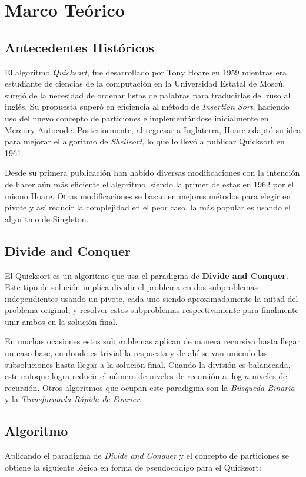 \documentclass[conference]{IEEEtran}
\begin{document}
\section{Marco Teórico}
\subsection{Antecedentes Históricos}
El algoritmo \textit{Quicksort}, fue desarrollado por Tony Hoare en 1959 mientras era estudiante de ciencias de la computación en la Universidad Estatal de Moscú, 
surgió de la necesidad de ordenar listas de palabras para traducirlas del ruso al inglés. 
Su propuesta superó en eficiencia al método de \textit{Insertion Sort}, haciendo uso del nuevo concepto de particiones e implementándose inicialmente en Mercury Autocode. 
Posteriormente, al regresar a Inglaterra, Hoare adaptó su idea para mejorar el algoritmo de \textit{Shellsort}, lo que lo llevó a publicar Quicksort en 1961.\cite{original_paper}
\par
Desde su primera publicación han habido diversas modificaciones con la intención de hacer aún más eficiente el algoritmo, siendo la primer de estas en 1962 por el mismo Hoare.
Otras modificaciones se basan en mejores métodos para elegir en pivote y así reducir la complejidad en el peor caso, la más popular es usando el algoritmo de Singleton.\cite{history} 

\subsection{Divide and Conquer}
El Quicksort es un algoritmo que usa el paradigma de \textbf{Divide and Conquer}. 
Este tipo de solución implica dividir el problema en dos subproblemas independientes usando un pivote, 
cada uno siendo aproximadamente la mitad del problema original, y resolver estos subproblemas respectivamente para finalmente unir ambos en la solución final.\par
En muchas ocasiones estos subproblemas aplican de manera recursiva hasta llegar un caso base, en donde es trivial la respuesta y de ahí se van uniendo las subsoluciones hasta llegar a la solución final.
Cuando la división es balanceada, este enfoque logra reducir el número de niveles de recursión a $\log{n}$ niveles de recursión.
Otros algoritmos que ocupan este paradigma son la \textit{Búsqueda Binaria} y la \textit{Transformada Rápida de Fourier}.\cite{divide_and_conquer}


\subsection{Algoritmo}
Aplicando el paradigma de \textit{Divide and Conquer} y el concepto de particiones se obtiene la siguiente lógica en forma de pseudocódigo para el Quicksort\cite{Grokking}:
\end{document}
